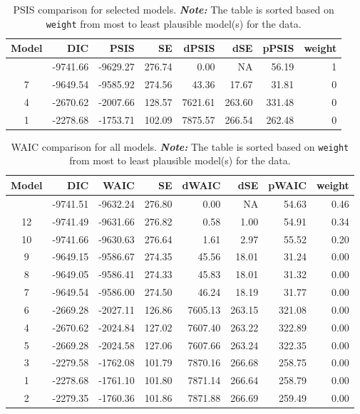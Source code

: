 \documentclass[
  authoryear,
  preprint,
  1p]{elsarticle}
\begin{document}
\begin{longtable}[]{@{}crrrrrrr@{}}

\caption{\label{tbl-rq1-psis}PSIS comparison for selected models.
{\textbf{\emph{Note:}} The table is sorted based on \texttt{weight} from
most to least plausible model(s) for the data.}}

\tabularnewline

\toprule\noalign{}
Model & DIC & PSIS & SE & dPSIS & dSE & pPSIS & weight \\
\midrule\noalign{}
\endhead
\bottomrule\noalign{}
\endlastfoot
10 & -9741.66 & -9629.27 & 276.74 & 0.00 & NA & 56.19 & 1 \\
7 & -9649.54 & -9585.92 & 274.56 & 43.36 & 17.67 & 31.81 & 0 \\
4 & -2670.62 & -2007.66 & 128.57 & 7621.61 & 263.60 & 331.48 & 0 \\
1 & -2278.68 & -1753.71 & 102.09 & 7875.57 & 266.54 & 262.48 & 0 \\

\end{longtable}

\begin{longtable}[]{@{}crrrrrrr@{}}

\caption{\label{tbl-rq3-waic}WAIC comparison for all models.
{\textbf{\emph{Note:}} The table is sorted based on \texttt{weight} from
most to least plausible model(s) for the data.}}

\tabularnewline

\toprule\noalign{}
Model & DIC & WAIC & SE & dWAIC & dSE & pWAIC & weight \\
\midrule\noalign{}
\endhead
\bottomrule\noalign{}
\endlastfoot
11 & -9741.51 & -9632.24 & 276.80 & 0.00 & NA & 54.63 & 0.46 \\
12 & -9741.49 & -9631.66 & 276.82 & 0.58 & 1.00 & 54.91 & 0.34 \\
10 & -9741.66 & -9630.63 & 276.64 & 1.61 & 2.97 & 55.52 & 0.20 \\
9 & -9649.15 & -9586.67 & 274.35 & 45.56 & 18.01 & 31.24 & 0.00 \\
8 & -9649.05 & -9586.41 & 274.33 & 45.83 & 18.01 & 31.32 & 0.00 \\
7 & -9649.54 & -9586.00 & 274.50 & 46.24 & 18.19 & 31.77 & 0.00 \\
6 & -2669.28 & -2027.11 & 126.86 & 7605.13 & 263.15 & 321.08 & 0.00 \\
4 & -2670.62 & -2024.84 & 127.02 & 7607.40 & 263.22 & 322.89 & 0.00 \\
5 & -2669.28 & -2024.58 & 127.06 & 7607.66 & 263.24 & 322.35 & 0.00 \\
3 & -2279.58 & -1762.08 & 101.79 & 7870.16 & 266.68 & 258.75 & 0.00 \\
1 & -2278.68 & -1761.10 & 101.80 & 7871.14 & 266.64 & 258.79 & 0.00 \\
2 & -2279.35 & -1760.36 & 101.86 & 7871.88 & 266.69 & 259.49 & 0.00 \\

\end{longtable}
\end{document}
